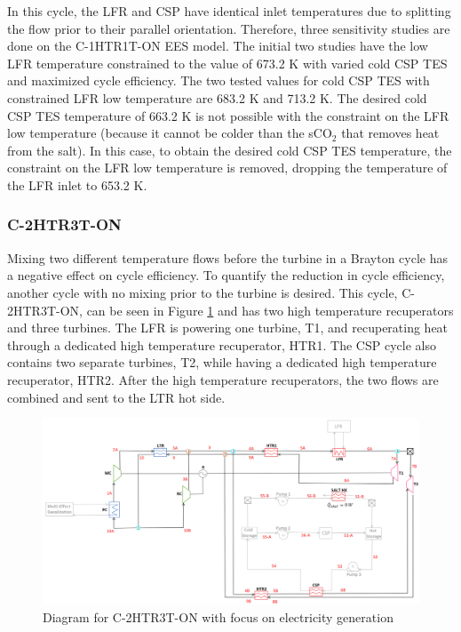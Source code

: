 \begin{paracol}{2}
\linenumbers
\switchcolumn

In this cycle, the LFR and CSP have identical inlet temperatures due to splitting the flow prior to their parallel orientation. Therefore, three sensitivity studies are done on the C-1HTR1T-ON EES model. The initial two studies have the low LFR temperature constrained to the value of 673.2 K with varied cold CSP TES and maximized cycle efficiency. The two tested values for cold CSP TES with constrained LFR low temperature are 683.2 K and 713.2 K. The desired cold CSP TES temperature of 663.2 K is not possible with the constraint on the LFR low temperature (because it cannot be colder than the sCO$_2$ that removes heat from the salt). In this case, to obtain the desired cold CSP TES temperature, the constraint on the LFR low temperature is removed, dropping the temperature of the LFR inlet to 653.2 K. 


\subsubsection{C-2HTR3T-ON} %

Mixing two different temperature flows before the turbine in a Brayton cycle has a negative effect on cycle efficiency. To quantify the reduction in cycle efficiency, another cycle with no mixing prior to the turbine is desired. This cycle, C-2HTR3T-ON, can be seen in Figure \ref{c-2htr3t-on} and has two high temperature recuperators and three turbines. The LFR is powering one turbine, T1, and recuperating heat through a dedicated high temperature recuperator, HTR1. The CSP cycle also contains two separate turbines, T2, while having a dedicated high temperature recuperator, HTR2. After the high temperature recuperators, the two flows are combined and sent to the LTR hot side. 

\end{paracol}
\begin{figure}[H]
    \widefigure
    \includegraphics[width=\linewidth]{Definitions/c-2htr3t-on.pdf}
    \caption{Diagram for C-2HTR3T-ON with focus on electricity generation\label{c-2htr3t-on}}
\end{figure}
